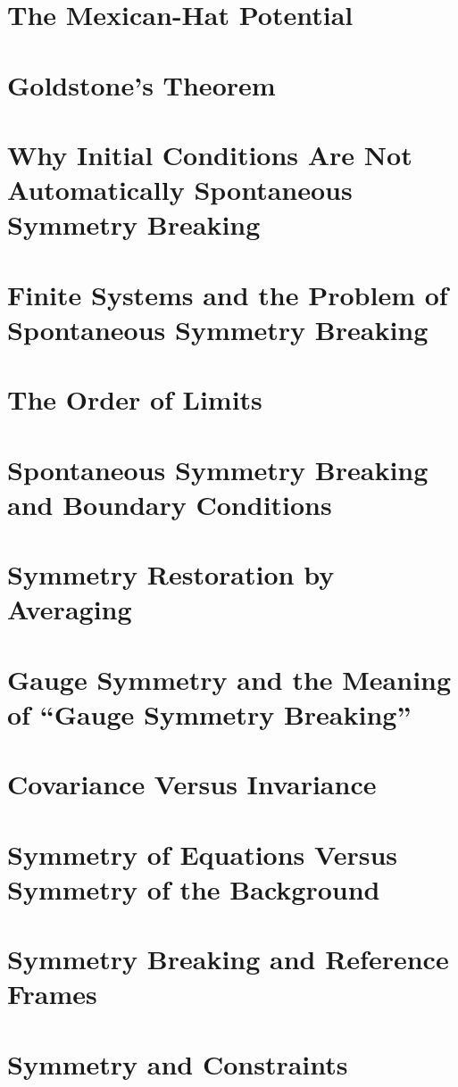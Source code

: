 \section{The Mexican-Hat Potential}
\label{sp:mh}
\section{ Goldstone's Theorem}
\label{sp:gt}
\section{Why Initial Conditions Are Not Automatically Spontaneous Symmetry Breaking}
\label{sp:ssb2}
\section{Finite Systems and the Problem of Spontaneous Symmetry Breaking}
\label{sp:ssb3}
\section{ The Order of Limits}
\label{sp:ssb4}
\section{ Spontaneous Symmetry Breaking and Boundary Conditions}
\label{sp:ssb5}
\section{Symmetry Restoration by Averaging}
\label{sp:rs}
\section{Gauge Symmetry and the Meaning of ``Gauge Symmetry Breaking''}
\label{sp:gs}
\section{ Covariance Versus Invariance}
\label{sp:cvi}
\section{Symmetry of Equations Versus Symmetry of the Background}
\label{sp:evb}
\section{ Symmetry Breaking and Reference Frames}
\label{sp:rf}
\section{ Symmetry and Constraints}
\label{sp:sc}
